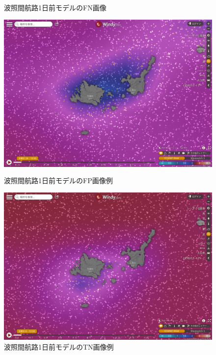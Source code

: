 \begin{figure}[htbp]
\begin{minipage}{0.5\hsize}
\begin{center}
  \end{center}
   \caption{波照間航路1日前モデルのFN画像}
  \label{hateruma_1_FN}
 \end{minipage}
\end{figure}

\begin{figure}[htbp]
 \begin{minipage}{0.5\hsize}
  \begin{center}
   \includegraphics[keepaspectratio, scale=0.16]{fig/chapter4/wave_hateruma_1/FP.png}
  \end{center}
  \caption{波照間航路1日前モデルのFP画像例}
  \label{hateruma_1_FP}
 \end{minipage}
 \begin{minipage}{0.5\hsize}
  \begin{center}
  \includegraphics[keepaspectratio, scale=0.16]{fig/chapter4/wave_hateruma_1/TN.png}
  \end{center}
   \caption{波照間航路1日前モデルのTN画像例}
  \label{hateruma_1_TN}
 \end{minipage}
\end{figure}

